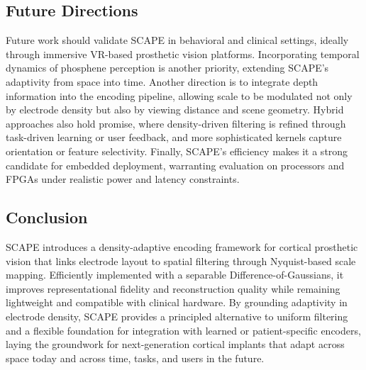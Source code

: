 \subsection{Future Directions}
Future work should validate SCAPE in behavioral and clinical settings, ideally through immersive VR-based prosthetic vision platforms. Incorporating temporal dynamics of phosphene perception is another priority, extending SCAPE’s adaptivity from space into time. Another direction is to integrate depth information into the encoding pipeline, allowing scale to be modulated not only by electrode density but also by viewing distance and scene geometry. Hybrid approaches also hold promise, where density-driven filtering is refined through task-driven learning or user feedback, and more sophisticated kernels capture orientation or feature selectivity. Finally, SCAPE’s efficiency makes it a strong candidate for embedded deployment, warranting evaluation on processors and FPGAs under realistic power and latency constraints.

\subsection{Conclusion}
SCAPE introduces a density-adaptive encoding framework for cortical prosthetic vision that links electrode layout to spatial filtering through Nyquist-based scale mapping. Efficiently implemented with a separable Difference-of-Gaussians, it improves representational fidelity and reconstruction quality while remaining lightweight and compatible with clinical hardware. By grounding adaptivity in electrode density, SCAPE provides a principled alternative to uniform filtering and a flexible foundation for integration with learned or patient-specific encoders, laying the groundwork for next-generation cortical implants that adapt across space today and across time, tasks, and users in the future.
